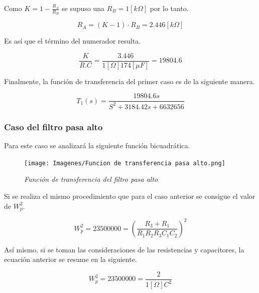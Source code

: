 \documentclass[12pt,A4paper,titlepage]{article}
\begin{document}
\bigskip
\hspace{1mm} Como \(K = 1 - \frac{R_A}{R_B}\) se supuso una \(R_B = 1 [k\Omega]\) por lo tanto.

\begin{equation}
    R_A = (K - 1) \cdot R_B = 2.446[k \Omega]
\end{equation}

\bigskip
\hspace{1mm} Es así que el término del numerador resulta.

\begin{equation}
    \frac{K}{R.C} = \frac{3.446}{1[\Omega] 174[\mu F]} = 19 804.6
\end{equation}

\bigskip
\hspace{1mm} Finalmente, la función de transferencia del primer caso es de la siguiente manera.

\begin{equation}
    \boxed{
         T_1 (s) = \frac{19 804.6 s}{S^2 + 3 184.42 s + 6 632 656}
    }
\end{equation}

\newpage
\subsubsection{Caso del filtro pasa alto}
\hspace{1mm} Para este caso se analizará la siguiente función bicuadrática.

\begin{figure}[!h] 
  \centering
  \texttt{[image: Imagenes/Funcion de transferencia pasa alto.png]}
  \caption{\textit{Función de transferencia del filtro pasa alto}}
\end{figure}

\hspace{1mm} Si se realiza el mismo procedimiento que para el caso anterior se consigue el valor de \(W_p ^2 \).

\begin{equation}
    W_p^2 = 23 500 000 = (\frac{R_3 + R_1}{R_1 R_2 R_3 C_1 C_2})^2
\end{equation}

\bigskip
 \hspace{1mm} Así mismo, si se toman las consideraciones de las resistencias y capacitores, la ecuación anterior se resume en la siguiente.
 
 \begin{equation}
     W_p^2 = 23 500 000 = \frac{2}{1[\Omega] C^2}
 \end{equation}
\end{document}
